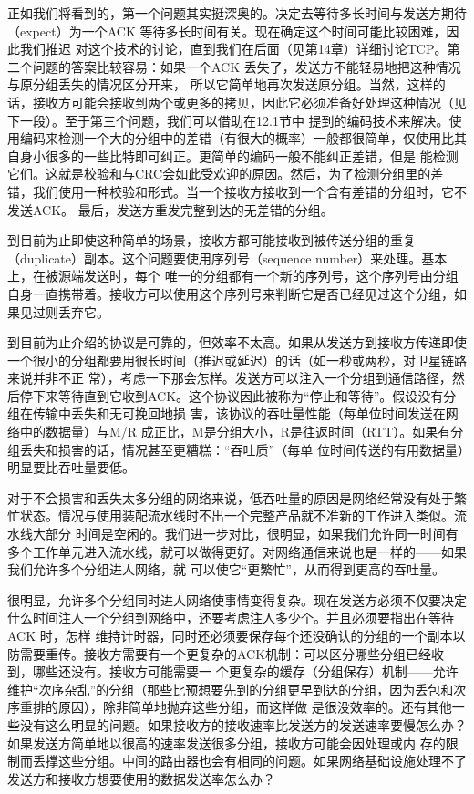 正如我们将看到的，第一个问题其实挺深奥的。决定去等待多长时间与发送方期待（expect）为一个ACK 等待多长时间有关。现在确定这个时间可能比较困难，因此我们推迟
对这个技术的讨论，直到我们在后面（见第14章）详细讨论TCP。第二个问题的答案比较容易：如果一个ACK 丢失了，发送方不能轻易地把这种情况与原分组丢失的情况区分开来，
所以它简单地再次发送原分组。当然，这样的话，接收方可能会接收到两个或更多的拷贝，因此它必须准备好处理这种情况（见下一段）。至于第三个问题，我们可以借助在12.1节中
提到的编码技术来解决。使用编码来检测一个大的分组中的差错（有很大的概率）一般都很简单，仅使用比其自身小很多的一些比特即可纠正。更简单的编码一般不能纠正差错，但是
能检测它们。这就是校验和与CRC会如此受欢迎的原因。然后，为了检测分组里的差错，我们使用一种校验和形式。当一个接收方接收到一个含有差错的分组时，它不发送ACK。
最后，发送方重发完整到达的无差错的分组。

到目前为止即使这种简单的场景，接收方都可能接收到被传送分组的重复（duplicate）副本。这个问题要使用序列号（sequence number）来处理。基本上，在被源端发送时，每个
唯一的分组都有一个新的序列号，这个序列号由分组自身一直携带着。接收方可以使用这个序列号来判断它是否已经见过这个分组，如果见过则丢弃它。

到目前为止介绍的协议是可靠的，但效率不太高。如果从发送方到接收方传递即使一个很小的分组都要用很长时间（推迟或延迟）的话（如一秒或两秒，对卫星链路来说并非不正
常），考虑一下那会怎样。发送方可以注入一个分组到通信路径，然后停下来等待直到它收到ACK。这个协议因此被称为“停止和等待”。假设没有分组在传输中丢失和无可挽回地损
害，该协议的吞吐量性能（每单位时间发送在网络中的数据量）与M/R 成正比，M是分组大小，R是往返时间（RTT）。如果有分组丢失和损害的话，情况甚至更糟糕：“吞吐质”（每单
位时间传送的有用数据量）明显要比吞吐量要低。

对于不会损害和丢失太多分组的网络来说，低吞吐量的原因是网络经常没有处于繁忙状态。情况与使用装配流水线时不出一个完整产品就不准新的工作进入类似。流水线大部分
时间是空闲的。我们进一步对比，很明显，如果我们允许同一时间有多个工作单元进入流水线，就可以做得更好。对网络通信来说也是一样的——如果我们允许多个分组进人网络，就
可以使它“更繁忙”，从而得到更高的吞吐量。

很明显，允许多个分组同时进人网络使事情变得复杂。现在发送方必须不仅要决定什么时间注人一个分组到网络中，还要考虑注人多少个。并且必须要指出在等待ACK 时，怎样
维持计时器，同时还必须要保存每个还没确认的分组的一个副本以防需要重传。接收方需要有一个更复杂的ACK机制：可以区分哪些分组已经收到，哪些还没有。接收方可能需要一
个更复杂的缓存（分组保存）机制——允许维护“次序杂乱”的分组（那些比预想要先到的分组更早到达的分组，因为丢包和次序重排的原因），除非简单地抛弃这些分组，而这样做
是很没效率的。还有其他一些没有这么明显的问题。如果接收方的接收速率比发送方的发送速率要慢怎么办？如果发送方简单地以很高的速率发送很多分组，接收方可能会因处理或内
存的限制而丢撑这些分组。中间的路由器也会有相同的问题。如果网络基础设施处理不了发送方和接收方想要使用的数据发送率怎么办？
